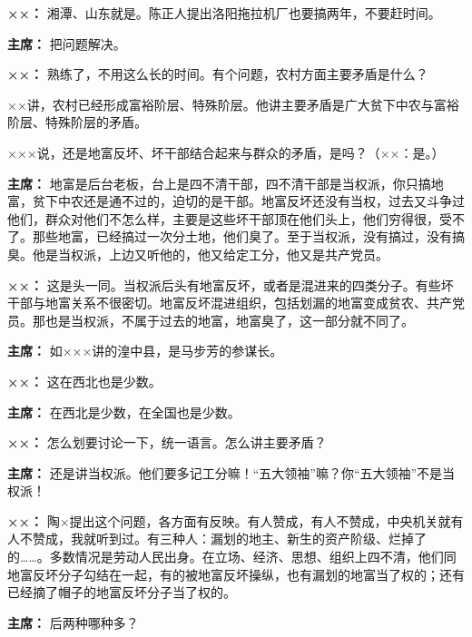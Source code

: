 \begin{duihua}
\item[\textbf{××：}] 湘潭、山东就是。陈正人提出洛阳拖拉机厂也要搞两年，不要赶时间。

\item[\textbf{主席：}] 把问题解决。

\item[\textbf{××：}] 熟练了，不用这么长的时间。有个问题，农村方面主要矛盾是什么？

××讲，农村已经形成富裕阶层、特殊阶层。他讲主要矛盾是广大贫下中农与富裕阶层、特殊阶层的矛盾。

×××说，还是地富反坏、坏干部结合起来与群众的矛盾，是吗？（××：是。）

\item[\textbf{主席：}] 地富是后台老板，台上是四不清干部，四不清干部是当权派，你只搞地富，贫下中农还是通不过的，迫切的是干部。地富反坏还没有当权，过去又斗争过他们，群众对他们不怎么样，主要是这些坏干部顶在他们头上，他们穷得很，受不了。那些地富，已经搞过一次分土地，他们臭了。至于当权派，没有搞过，没有搞臭。他是当权派，上边又听他的，他又给定工分，他又是共产党员。

\item[\textbf{××：}] 这是头一同。当权派后头有地富反坏，或者是混进来的四类分子。有些坏干部与地富关系不很密切。地富反坏混进组织，包括划漏的地富变成贫农、共产党员。那也是当权派，不属于过去的地富，地富臭了，这一部分就不同了。

\item[\textbf{主席：}] 如×××讲的湟中县，是马步芳的参谋长。

\item[\textbf{××：}] 这在西北也是少数。

\item[\textbf{主席：}] 在西北是少数，在全国也是少数。

\item[\textbf{××：}] 怎么划要讨论一下，统一语言。怎么讲主要矛盾？

\item[\textbf{主席：}] 还是讲当权派。他们要多记工分嘛！“五大领袖”嘛？你“五大领袖”不是当权派！

\item[\textbf{××：}] 陶×提出这个问题，各方面有反映。有人赞成，有人不赞成，中央机关就有人不赞成，我就听到过。有三种人：漏划的地主、新生的资产阶级、烂掉了的……。多数情况是劳动人民出身。在立场、经济、思想、组织上四不清，他们同地富反坏分子勾结在一起，有的被地富反坏操纵，也有漏划的地富当了权的；还有已经摘了帽子的地富反坏分子当了权的。

\item[\textbf{主席：}] 后两种哪种多？


\end{duihua}
